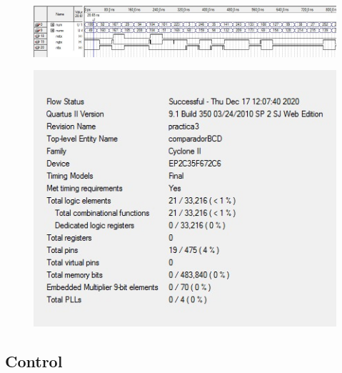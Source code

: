 \documentclass[12pt, a4papre]{article}
\begin{document}
\begin{figure}[H]
		\begin{center}
		\includegraphics[width=130mm]{simulacioComparador.jpeg}
		\end{center}
	\end{figure}



\begin{figure}[H]
		\begin{center}
		\includegraphics[width=130mm]{informeComparador.jpeg}
		\end{center}
	\end{figure}


\subsection{Control}
		
\end{document}
